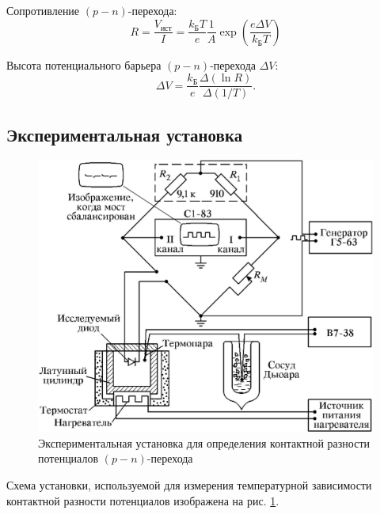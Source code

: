 \documentclass[a4paper, 12pt]{article}
\begin{document}
	Сопротивление $(p-n)$-перехода:
	\begin{equation}
		R=\frac{V_{\text{ист}}}{I}=\frac{k_{\text{Б}}T}{e}\frac{1}{A}\exp{\left(\frac{e\Delta V}{k_{\text{Б}}T}\right)}
	\end{equation}

	Высота потенциального барьера $(p-n)$-перехода $\Delta V$:
	\begin{equation}
		\Delta V=\frac{k_{\text{Б}}}{e}\frac{\Delta(\ln{R})}{\Delta(1/T)}.
	\end{equation}
	\subsection{Экспериментальная установка}
	\begin{figure}[!htb]
		\centering
		\includegraphics[scale=0.3]{scheme.jpg}
		\caption{Экспериментальная установка для определения контактной разности потенциалов $(p-n)$-перехода}
		\label{fig:scheme}
	\end{figure}
	Схема установки, используемой для измерения температурной зависимости контактной разности потенциалов изображена на рис. \ref{fig:scheme}.
\end{document}
